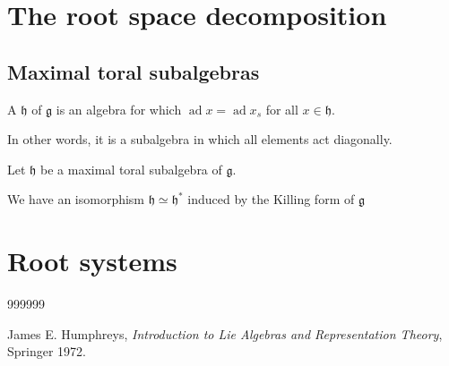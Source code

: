\documentclass{article}
\newcommand*\ad{\operatorname{ad}}
\newcommand*\frkg{{\ensuremath{\mathfrak{g}}}}
\newcommand*\frkh{{\ensuremath{\mathfrak{h}}}}
\begin{document}
\section{The root space decomposition}

\subsection{Maximal toral subalgebras}

\begin{definition}
    A  $\frkh$ of $\frkg$ is an algebra for which $\ad x = \ad x_s$ for all $x \in \frkh$.
\end{definition}

In other words, it is a subalgebra in which all elements act diagonally.

\begin{proposition}
    Let $\frkh$ be a maximal toral subalgebra of $\frkg$.

    We have an isomorphism $\frkh \simeq \frkh^\ast$ induced by the Killing form of $\frkg$
\end{proposition}

\section{Root systems}

\begin{definition}
\end{definition}

\begin{thebibliography}{999999}
    \raggedright\footnotesize

    James E. Humphreys, \textit{Introduction to Lie Algebras and Representation Theory}, Springer 1972.

\end{thebibliography}
\end{document}
